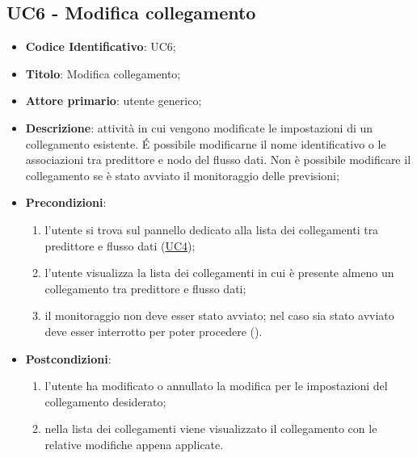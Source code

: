 		
	\label{par:UC6}
	\subsection{UC6 - Modifica collegamento}
	


		\begin{itemize}
			\item\textbf{Codice Identificativo}: UC6;
			\item\textbf{Titolo}: Modifica collegamento;
			\item\textbf{Attore primario}: utente generico;
			\item\textbf{Descrizione}: attività in cui vengono modificate le impostazioni di un collegamento esistente. \'E possibile modificarne il nome identificativo o le associazioni tra predittore e nodo del flusso dati. Non è possibile modificare il collegamento se è stato avviato il monitoraggio delle previsioni;
			\item\textbf{Precondizioni}:
			\begin{enumerate}
			\item l'utente si trova sul pannello dedicato alla lista dei collegamenti tra predittore e
flusso dati (\hyperref[par:UC4]{UC4});
			\item  l'utente visualizza la lista dei collegamenti in cui è presente almeno un collegamento tra predittore e flusso dati;	
			\item il monitoraggio non deve esser stato avviato; nel caso sia stato avviato deve esser interrotto per poter procedere ().
			\end{enumerate}
							
			\item\textbf{Postcondizioni}:
			\begin{enumerate}
				\item l'utente ha modificato o annullato la modifica per le impostazioni del collegamento desiderato;
				\item nella lista dei collegamenti viene visualizzato il collegamento con le relative modifiche appena applicate.			
			
			\end{enumerate}
				

\end{itemize}
